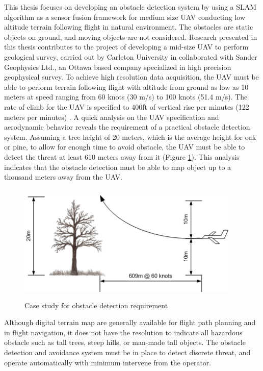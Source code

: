 This thesis focuses on developing an obstacle detection system by
using a SLAM algorithm as a sensor fusion framework for medium size
UAV conducting low altitude terrain following flight in natural
environment. The obstacles are static objects on ground, and moving
objects are not considered. Research presented in this thesis
contributes to the project of developing a mid-size UAV to perform
geological survey, carried out by Carleton University in collaborated
with Sander Geophysics Ltd., an Ottawa based company specialized in
high precision geophysical survey. To achieve high resolution data
acquisition, the UAV must be able to perform terrain following flight
with altitude from ground as low as 10 meters at speed ranging from 60
knots (30 m/s) to 100 knots (51.4 m/s). The rate of climb for the UAV
is specified to 400ft of vertical rise per minutes (122 meters per
minutes) \cite{james_geosurv_2008}. A quick analysis on the UAV
specification and aerodynamic behavior reveals the requirement of a
practical obstacle detection system. Assuming a tree height of 20
meters, which is the average height for oak or pine, to allow for
enough time to avoid obstacle, the UAV must be able to detect the
threat at least 610 meters away from it (Figure \ref{ob}). This
analysis indicates that the obstacle detection must be able to map
object up to a thousand meters away from the UAV.

\begin{figure}[h]
\centering
\includegraphics[width=300pt,height=160pt]{./Figures/ProblemStatement.png}
\caption {Case study for obstacle detection requirement}
\label{ob}
\end{figure}

Although digital terrain map are generally available for flight path 
planning and in flight navigation, it does not have the resolution to 
indicate all hazardous obstacle such as tall trees, steep hills, or 
man-made tall objects. The obstacle detection and avoidance system must 
be in place to detect discrete threat, and operate automatically with 
minimum intervene from the operator. 

